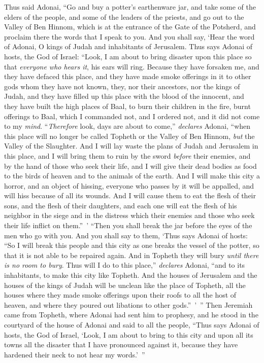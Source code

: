 \begin{biblechapter} %
 Thus said Adonai, “Go and buy a potter’s earthenware jar, and take some of the elders of the people, and some of the leaders of the priests,
\verse and go out to the Valley of Ben Hinnom, which is at the entrance of the Gate of the Potsherd, and proclaim there the words that I speak to you.
\verse And you shall say, ‘Hear the word of Adonai, O kings of Judah and inhabitants of Jerusalem. Thus says Adonai of hosts, the God of Israel: “Look, I am about to bring disaster upon this place so that \textit{everyone who hears it}, his ears will ring.
\verse Because they have forsaken me, and they have defaced this place, and they have made smoke offerings in it to other gods whom they have not known, they, nor their ancestors, nor the kings of Judah, and they have filled up this place with the blood of the innocent,
\verse and they have built the high places of Baal, to burn their children in the fire, burnt offerings to Baal, which I commanded not, and I ordered not, and it did not come to my \textit{mind}.
\verse “\textit{Therefore} look, days are about to come,” \textit{declares} Adonai, “when this place will no longer be called Topheth or the Valley of Ben Hinnom, \textit{but} the Valley of the Slaughter.
\verse And I will lay waste the plans of Judah and Jerusalem in this place, and I will bring them to ruin by the sword \textit{before} their enemies, and by the hand of those who seek their life, and I will give their dead bodies as food to the birds of heaven and to the animals of the earth.
\verse And I will make this city a horror, and an object of hissing, everyone who passes by it will be appalled, and will hiss because of all its wounds.
\verse And I will cause them to eat the flesh of their sons, and the flesh of their daughters, and each one will eat the flesh of his neighbor in the siege and in the distress which their enemies and those who seek their life inflict on them.” ’
\verse “Then you shall break the jar before the eyes of the men who go with you.
\verse And you shall say to them, ‘Thus says Adonai of hosts: “So I will break this people and this city as one breaks the vessel of the potter, so that it is not able to be repaired again. And in Topheth they will bury \textit{until there is no room to bury}.
\verse Thus will I do to this place,” \textit{declares} Adonai, “and to its inhabitants, to make this city like Topheth.
\verse And the houses of Jerusalem and the houses of the kings of Judah will be unclean like the place of Topheth, all the houses where they made smoke offerings upon their roofs to all the host of heaven, and where they poured out libations to other gods.” ’ ”
\verse Then Jeremiah came from Topheth, where Adonai had sent him to prophesy, and he stood in the courtyard of the house of Adonai and said to all the people,
\verse “Thus says Adonai of hosts, the God of Israel, ‘Look, I am about to bring to this city and upon all its towns all the disaster that I have pronounced against it, because they have hardened their neck to not hear my words.’ ”
\end{biblechapter}

